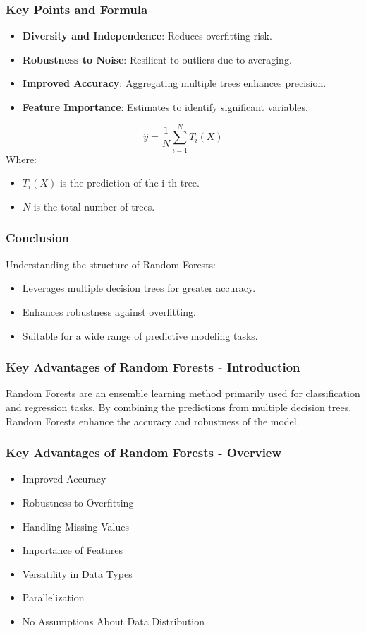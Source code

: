 \documentclass[aspectratio=169]{beamer}
\begin{document}
\begin{frame}[fragile]
    \frametitle{Key Points and Formula}
    \begin{itemize}
        \item \textbf{Diversity and Independence}: Reduces overfitting risk.
        \item \textbf{Robustness to Noise}: Resilient to outliers due to averaging.
        \item \textbf{Improved Accuracy}: Aggregating multiple trees enhances precision.
        \item \textbf{Feature Importance}: Estimates to identify significant variables.
    \end{itemize}

    \begin{equation}
        \hat{y} = \frac{1}{N} \sum_{i=1}^{N} T_i(X)
    \end{equation}
    Where:
    \begin{itemize}
        \item \( T_i(X) \) is the prediction of the i-th tree.
        \item \( N \) is the total number of trees.
    \end{itemize}
\end{frame}

\begin{frame}[fragile]
    \frametitle{Conclusion}
    Understanding the structure of Random Forests:
    \begin{itemize}
        \item Leverages multiple decision trees for greater accuracy.
        \item Enhances robustness against overfitting.
        \item Suitable for a wide range of predictive modeling tasks.
    \end{itemize}
\end{frame}

\begin{frame}[fragile]
    \frametitle{Key Advantages of Random Forests - Introduction}
    Random Forests are an ensemble learning method primarily used for classification and regression tasks. 
    By combining the predictions from multiple decision trees, Random Forests enhance the accuracy and robustness of the model.
\end{frame}

\begin{frame}[fragile]
    \frametitle{Key Advantages of Random Forests - Overview}
    \begin{itemize}
        \item Improved Accuracy
        \item Robustness to Overfitting
        \item Handling Missing Values
        \item Importance of Features
        \item Versatility in Data Types
        \item Parallelization
        \item No Assumptions About Data Distribution
    \end{itemize}
\end{frame}
\end{document}
